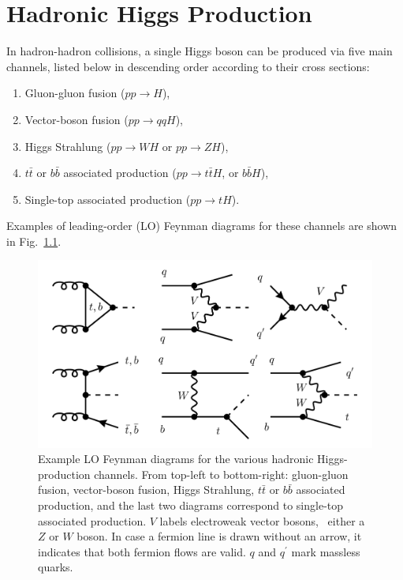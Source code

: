 
\chapter{Hadronic Higgs Production}\label{chap:four}
In hadron-hadron collisions, a single Higgs boson can be produced via five main channels, listed below in descending order according to their cross sections:
\begin{enumerate}
  \item Gluon-gluon fusion ($pp \rightarrow H$),
  \item Vector-boson fusion ($pp \rightarrow qqH$),
  \item Higgs Strahlung ($pp \rightarrow WH$ or $pp \rightarrow Z H$),
  \item $t \bar{t}$ or $b \bar{b}$ associated production ($pp \rightarrow t \bar{t} H$, or $b \bar{b} H$),
  \item Single-top associated production ($pp \rightarrow t H$).
\end{enumerate}
Examples of leading-order (LO) Feynman diagrams for these channels are shown in Fig.~\ref{fig:4:channels}.
\begin{figure}[ht]
\centering
\includegraphics[scale=0.38]{Images/channels.pdf}
\caption{Example \acs{LO} Feynman diagrams for the various hadronic Higgs-production channels. From top-left to bottom-right: gluon-gluon fusion, vector-boson fusion, Higgs Strahlung, $t \bar{t}$ or $b \bar{b}$ associated production, and the last two diagrams correspond to single-top associated production. $V$ labels electroweak vector bosons, \ie\ either a $Z$ or $W$ boson. In case a fermion line is drawn without an arrow, it indicates that both fermion flows are valid. $q$ and $q^\prime$ mark massless quarks.}
\label{fig:4:channels}
\end{figure}
